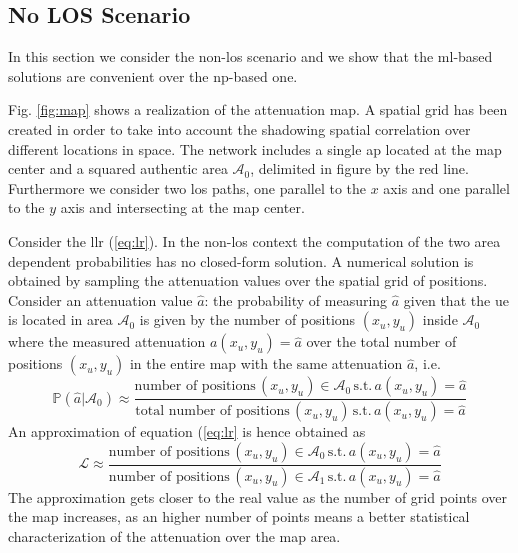 \documentclass[draftcls,onecolumn,12pt]{IEEEtran}
\begin{document}
\subsection{No LOS Scenario}\label{sec:res_nLos}
In this section we consider the non-\ac{los} scenario and we show that the \ac{ml}-based solutions are convenient over the \ac{np}-based one.

Fig. \ref{fig:map} shows a realization of the attenuation map. A spatial grid has been created in order to take into account the shadowing spatial correlation over different locations in space. The network includes a single \ac{ap} located at the map center and a squared authentic area $\mathcal{A}_0$, delimited in figure by the red line. Furthermore we consider two \ac{los} paths, one parallel to the $x$ axis and one parallel to the $y$ axis and intersecting at the map center.

Consider the \ac{llr} (\ref{eq:lr}). In the non-\ac{los} context the computation of the two area dependent probabilities has no closed-form solution. A numerical solution is obtained by sampling the attenuation values over the spatial grid of positions. Consider an attenuation value $\hat{a}$: the probability of measuring $\hat{a}$ given that the \ac{ue} is located in area $\mathcal{A}_0$ is given by the number of positions $(x_u,y_u)$ inside $\mathcal{A}_0$ where the measured attenuation $a(x_u,y_u)=\hat{a}$ over the total number of positions $(x_u,y_u)$ in the entire map with the same attenuation $\hat{a}$, i.e.
\begin{equation}
    \mathbb{P}(\hat{a}|\mathcal{A}_0) \approx \frac{\text{number of positions} \, (x_u,y_u) \in \mathcal{A}_0 \, \text{s.t.} \, a(x_u,y_u) = \hat{a}}{\text{total number of positions} \, (x_u,y_u) \, \text{s.t.} \, a(x_u,y_u) = \hat{a}}
\end{equation}
An approximation of equation (\ref{eq:lr} is hence obtained as
\begin{equation}\label{eq:lrApp}
    \mathcal{L} \approx \frac{\text{number of positions} \, (x_u,y_u) \in \mathcal{A}_0 \, \text{s.t.} \, a(x_u,y_u) = \hat{a}}{\text{number of positions} \, (x_u,y_u) \in \mathcal{A}_1 \, \text{s.t.} \, a(x_u,y_u) = \hat{a}}
\end{equation}
The approximation gets closer to the real value as the number of grid points over the map increases, as an higher number of points means a better statistical characterization of the attenuation over the map area.
\end{document}
